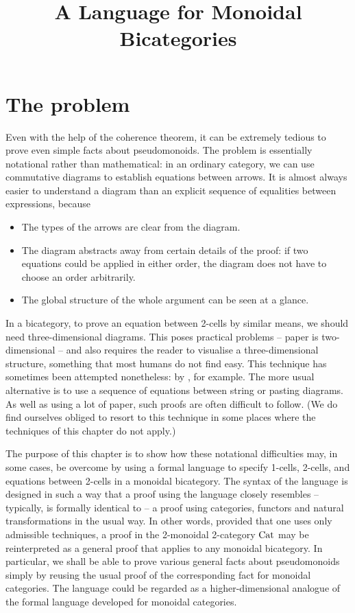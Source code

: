 \documentclass{robinthesisdraft}
\title{A Language for Monoidal Bicategories}
\begin{document}
\maketitle
%
\section{The problem}
Even with the help of the coherence theorem, it can be extremely
tedious to prove even simple facts about pseudomonoids. The problem
is essentially notational rather than mathematical: in an ordinary
category, we can use commutative diagrams to establish equations
between arrows. It is almost always easier to understand a diagram
than an explicit sequence of equalities between expressions, because
\begin{itemize}
\item The types of the arrows are clear from the diagram.
\item The diagram abstracts away from certain details of the proof:
	if two equations could be applied in either order, the diagram
	does not have to choose an order arbitrarily.
\item The global structure of the whole argument can be seen at a glance.
\end{itemize}
In a bicategory, to prove an equation between 2-cells by similar
means, we should need three-dimensional diagrams. This poses
practical problems -- paper is two-dimensional -- and also requires
the reader to visualise a three-dimensional structure, something
that most humans do not find easy. This technique has sometimes
been attempted nonetheless: by \citet[][Section~3.4]{LackThesis},
for example.
%
The more usual alternative is to use a sequence of equations
between string or pasting diagrams. As well as using a lot
of paper, such proofs are often difficult to follow.
(We do find ourselves obliged to resort to this technique in some
places where the techniques of this chapter do not apply.)

The purpose of this chapter is to show how these notational
difficulties may, in some cases, be overcome by using a formal
language to specify 1-cells, 2-cells, and equations between 2-cells
in a monoidal bicategory. The syntax of the language is designed in such
a way that a proof using the language closely resembles -- typically,
is formally identical to -- a proof
using categories, functors and natural transformations in the usual
way. In other words, provided that one uses only admissible techniques,
a proof in the 2-monoidal 2-category $\mathrm{Cat}$ may be reinterpreted
as a general proof that applies to any monoidal bicategory. In particular,
we shall be able to prove various general facts about pseudomonoids
simply by reusing the usual proof of the corresponding fact for
monoidal categories. The language could be regarded as a higher-dimensional analogue
of the formal language developed \citet{JayLanguages} for monoidal
categories.
\end{document}
